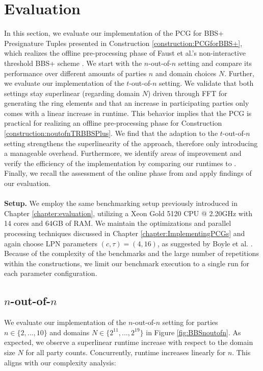 \section{Evaluation}
\label{sec:evalBBSPlusPCG}
In this section, we evaluate our implementation of the PCG for BBS+ Presignature Tuples presented in Construction \ref{construction:PCGforBBS+}, which realizes the offline pre-processing phase of Faust et al.'s non-interactive threshold BBS+ scheme \cite{cryptoeprint:2023/1076}. We start with the $n$-out-of-$n$ setting and compare its performance over different amounts of parties $n$ and domain choices $N$. Further, we evaluate our implementation of the $t$-out-of-$n$ setting. We validate that both settings stay superlinear (regarding domain $N$) driven through FFT for generating the ring elements and that an increase in participating parties only comes with a linear increase in runtime. This behavior implies that the PCG is practical for realizing an offline pre-processing phase for Construction \ref{construction:noutofnTRBBSPlus}. We find that the adaption to the $t$-out-of-$n$ setting strengthens the superlinearity of the approach, therefore only introducing a manageable overhead. Furthermore, we identify areas of improvement and verify the efficiency of the implementation by comparing our runtimes to \cite{abram2022low}. Finally, we recall the assessment of the online phase from \cite{cryptoeprint:2023/1076} and apply findings of our evaluation.
\\\\
\textbf{Setup.} We employ the same benchmarking setup previously introduced in Chapter \ref{chapter:evaluation}, utilizing a Xeon Gold 5120 CPU @ 2.20GHz with 14 cores and 64GB of RAM. We maintain the optimizations and parallel processing techniques discussed in Chapter \ref{chapter:ImplementingPCGs} and again choose LPN parameters $(c,\tau)=(4,16)$, as suggested by Boyle et al. \cite{boyle2020efficient}. Because of the complexity of the benchmarks and the large number of repetitions within the constructions, we limit our benchmark execution to a single run for each parameter configuration.

\subsection{$n$-out-of-$n$}
We evaluate our implementation of the $n$-out-of-$n$ setting for parties $n\in \{2, ..., 10\}$ and domains $N\in \{2^{11}, ...,2^{19}\}$ in Figure \ref{fig:BBSnoutofn}. As expected, we observe a superlinear runtime increase with respect to the domain size $N$ for all party counts. Concurrently, runtime increases linearly for $n$. This aligns with our complexity analysis:

